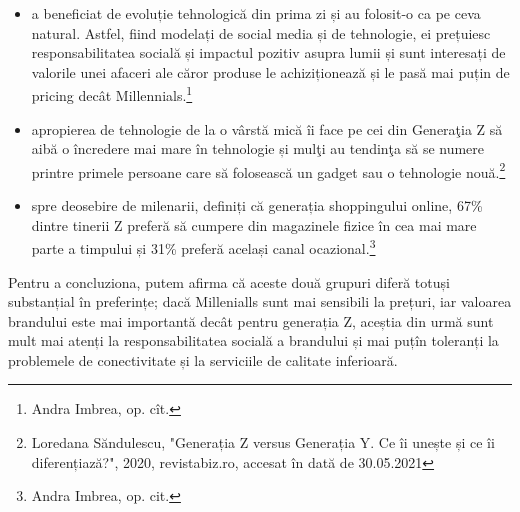 \documentclass[a4paper, 12pt]{article}
\begin{document}
		\begin{itemize}
			\item a beneficiat de evoluție tehnologică din prima zi și au folosit-o ca pe ceva natural. Astfel, fiind modelați de social media și de tehnologie, ei prețuiesc responsabilitatea socială și impactul pozitiv asupra lumii și sunt interesați de valorile unei afaceri ale căror produse le achiziționează și le pasă mai puțin de pricing decât Millennials.\footnote{Andra Imbrea, op. cît.}
			\item apropierea de tehnologie de la o vârstă mică îi face pe cei din Generaţia Z să aibă o încredere mai mare în tehnologie și mulţi au tendinţa să se numere printre primele persoane care să folosească un gadget sau o tehnologie nouă.\footnote{Loredana Săndulescu, "Generația Z versus Generația Y. Ce îi unește și ce îi diferențiază?", 2020, revistabiz.ro, accesat în dată de 30.05.2021 }
			\item spre deosebire de milenarii, definiți că generația shoppingului online, 67\% dintre tinerii Z preferă să cumpere din magazinele fizice în cea mai mare parte a timpului și 31\% preferă același canal ocazional.\footnote{Andra Imbrea, op. cit.}
		\end{itemize}	
			
		 \quad Pentru a concluziona, putem afirma că aceste două grupuri diferă totuși substanțial în preferințe; dacă Millenialls sunt mai sensibili la prețuri, iar valoarea brandului este mai importantă decât pentru generația Z, aceștia din urmă sunt mult mai atenți la responsabilitatea socială a brandului și mai puțîn toleranți la problemele de conectivitate și la serviciile de calitate inferioară.
	\newpage
\end{document}
